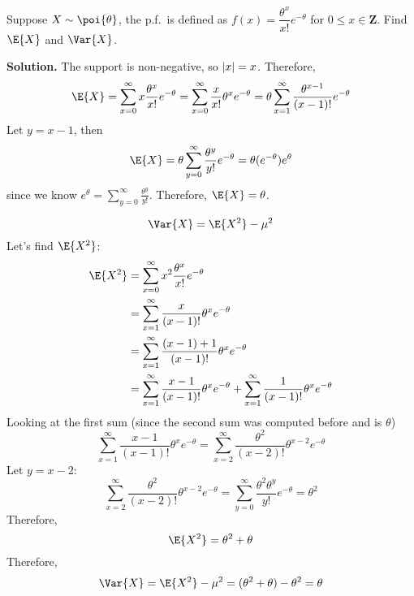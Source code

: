 \begin{Example}{}{}
    Suppose $ X \sim \poi{\theta} $, the p.f.\ is defined as
    $ f(x)=\dfrac{\theta^x}{x!} e^{-\theta} $
    for $ 0\le x\in\mathbf{Z} $. Find $ \E{X} $ and $ \Var{X} $.

    \textbf{Solution.} The support is non-negative, so $ \lvert x\rvert=x $.
    Therefore,
    \[ \E{X}=\sum\limits_{x=0}^{\infty} x \frac{\theta^x}{x!} e^{-\theta}
        =\sum\limits_{x=0}^{\infty} \frac{x}{x!} \theta^x e^{-\theta}
        =\theta \sum\limits_{x=1}^{\infty} \frac{\theta^{x-1}}{(x-1)!}
        e^{-\theta}  \]
    Let $ y=x-1 $, then
    \[ \E{X}= \theta\sum\limits_{y=0}^{\infty} \frac{\theta^y}{y!} e^{-\theta}=\theta(e^{-\theta})e^{\theta} \]
    since we know $\displaystyle  e^{\theta}=\sum\limits_{y=0}^{\infty} \frac{\theta^y}{y!} $.
    Therefore, $ \E{X}= \theta $.

    \[ \Var{X}=\E{X^2}-\mu^2 \]
    Let's find $ \E{X^2} $:
    \begin{align*}
        \E{X^2}
         & =\sum\limits_{x=0}^{\infty} x^2 \frac{\theta^x}{x!} e^{-\theta}         \\
         & =\sum\limits_{x=1}^{\infty} \frac{x}{(x-1)!}\theta^x e^{-\theta}        \\
         & =\sum\limits_{x=1}^{\infty} \frac{(x-1)+1}{(x-1)!} \theta^x e^{-\theta} \\
         & =\sum\limits_{x=1}^{\infty} \frac{x-1}{(x-1)!}\theta^x e^{-\theta}+
        \sum\limits_{x=1}^{\infty} \frac{1}{(x-1)!}\theta^x e^{-\theta}
    \end{align*}
    Looking at the first sum (since the second sum was computed before
    and is $ \theta $)
    \[ \sum\limits_{x=1}^{\infty} \frac{x-1}{(x-1)!}\theta^x e^{-\theta}=
        \sum\limits_{x=2}^{\infty} \frac{\theta^2}{(x-2)!} \theta^{x-2}e^{-\theta} \]
    Let $ y=x-2 $:
    \[ \sum\limits_{x=2}^{\infty} \frac{\theta^2}{(x-2)!} \theta^{x-2}e^{-\theta}=
        \sum\limits_{y=0}^{\infty}\frac{\theta^2\theta^y}{y!}e^{-\theta}=
        \theta^2 \]
    Therefore,
    \[ \E{X^2}=\theta^2+\theta   \]
    Therefore,
    \[ \Var{X}=\E{X^2}-\mu^2=(\theta^2+\theta)-\theta^2=\theta \]
\end{Example}
